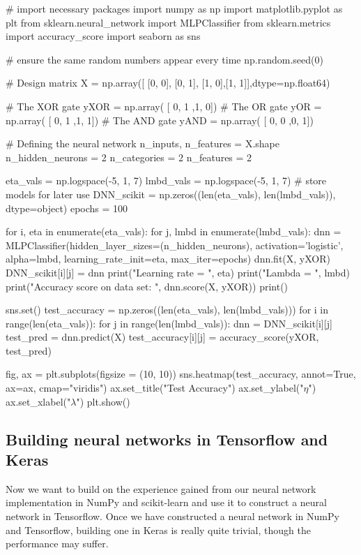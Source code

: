 \documentclass[%
oneside,                 %
final,                   %
10pt]{article}
\begin{document}
\bpycod
# import necessary packages
import numpy as np
import matplotlib.pyplot as plt
from sklearn.neural_network import MLPClassifier
from sklearn.metrics import accuracy_score
import seaborn as sns

# ensure the same random numbers appear every time
np.random.seed(0)

# Design matrix
X = np.array([ [0, 0], [0, 1], [1, 0],[1, 1]],dtype=np.float64)

# The XOR gate
yXOR = np.array( [ 0, 1 ,1, 0])
# The OR gate
yOR = np.array( [ 0, 1 ,1, 1])
# The AND gate
yAND = np.array( [ 0, 0 ,0, 1])

# Defining the neural network
n_inputs, n_features = X.shape
n_hidden_neurons = 2
n_categories = 2
n_features = 2

eta_vals = np.logspace(-5, 1, 7)
lmbd_vals = np.logspace(-5, 1, 7)
# store models for later use
DNN_scikit = np.zeros((len(eta_vals), len(lmbd_vals)), dtype=object)
epochs = 100

for i, eta in enumerate(eta_vals):
    for j, lmbd in enumerate(lmbd_vals):
        dnn = MLPClassifier(hidden_layer_sizes=(n_hidden_neurons), activation='logistic',
                            alpha=lmbd, learning_rate_init=eta, max_iter=epochs)
        dnn.fit(X, yXOR)
        DNN_scikit[i][j] = dnn
        print("Learning rate  = ", eta)
        print("Lambda = ", lmbd)
        print("Accuracy score on data set: ", dnn.score(X, yXOR))
        print()

sns.set()
test_accuracy = np.zeros((len(eta_vals), len(lmbd_vals)))
for i in range(len(eta_vals)):
    for j in range(len(lmbd_vals)):
        dnn = DNN_scikit[i][j]
        test_pred = dnn.predict(X)
        test_accuracy[i][j] = accuracy_score(yXOR, test_pred)

fig, ax = plt.subplots(figsize = (10, 10))
sns.heatmap(test_accuracy, annot=True, ax=ax, cmap="viridis")
ax.set_title("Test Accuracy")
ax.set_ylabel("$\eta$")
ax.set_xlabel("$\lambda$")
plt.show()


\epycod


\subsection{Building neural networks in Tensorflow and Keras}

Now we want  to build on the experience gained from our neural network implementation in NumPy and scikit-learn
and use it to construct a neural network in Tensorflow. Once we have constructed a neural network in NumPy
and Tensorflow, building one in Keras is really quite trivial, though the performance may suffer.  
\end{document}
